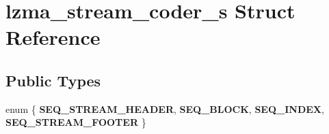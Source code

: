 \section{lzma\+\_\+stream\+\_\+coder\+\_\+s Struct Reference}
\label{structlzma__stream__coder__s}
\subsection*{Public Types}
\begin{DoxyCompactItemize}
\item 
\mbox{\label{structlzma__stream__coder__s_abe155bb33f9034bf60c5a9f56be53d99}} 
enum \{ {\bfseries S\+E\+Q\+\_\+\+S\+T\+R\+E\+A\+M\+\_\+\+H\+E\+A\+D\+ER}, 
{\bfseries S\+E\+Q\+\_\+\+B\+L\+O\+CK}, 
{\bfseries S\+E\+Q\+\_\+\+I\+N\+D\+EX}, 
{\bfseries S\+E\+Q\+\_\+\+S\+T\+R\+E\+A\+M\+\_\+\+F\+O\+O\+T\+ER}
 \}
\end{DoxyCompactItemize}
